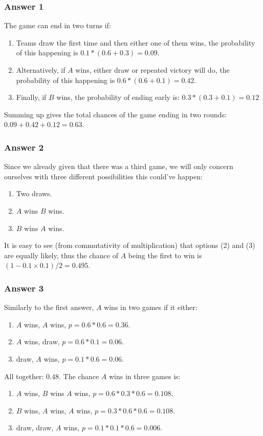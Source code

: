 \documentclass[11pt]{article}
\begin{document}
\subsubsection{Answer 1}
\label{sec-1-1-1}
The game can end in two turns if:
\begin{enumerate}
\item Teams draw the first time and then either one of them wins, the probability
of this happening is $0.1 * (0.6 + 0.3) = 0.09$.
\item Alternatively, if $A$ wins, either draw or repeated victory will do, 
the probability of this happening is $0.6 * (0.6 + 0.1) = 0.42$.
\item Finally, if $B$ wins, the probability of ending early is:
       $0.3 * (0.3 + 0.1) = 0.12$
\end{enumerate}

Summing up gives the total chances of the game ending in two rounds:
$0.09 + 0.42 + 0.12 = 0.63$.
\subsubsection{Answer 2}
\label{sec-1-1-2}
Since we already given that there was a third game, we will only concern
ourselves with three different possibilities this could've happen:
\begin{enumerate}
\item Two draws.
\item $A$ wins $B$ wins.
\item $B$ wins $A$ wins.
\end{enumerate}

It is easy to see (from commutativity of multiplication) that options (2)
and (3) are equally likely, thus the chance of $A$ being the first to
win is $(1 - 0.1 \times 0.1) / 2 = 0.495$.
\subsubsection{Answer 3}
\label{sec-1-1-3}
Similarly to the first answer, $A$ wins in two games if it either:
\begin{enumerate}
\item $A$ wins, $A$ wins, $p = 0.6 * 0.6 = 0.36$.
\item $A$ wins, draw, $p = 0.6 * 0.1 = 0.06$.
\item draw, $A$ wins, $p = 0.1 * 0.6 = 0.06$.
\end{enumerate}

All together: $0.48$.  The chance $A$ wins in three games is:
\begin{enumerate}
\item $A$ wins, $B$ wins $A$ wins, $p = 0.6 * 0.3 * 0.6 = 0.108$.
\item $B$ wins, $A$ wins, $A$ wins, $p = 0.3 * 0.6 * 0.6 = 0.108$.
\item draw, draw, $A$ wins, $p = 0.1 * 0.1 * 0.6 = 0.006$.
\end{enumerate}
\end{document}

